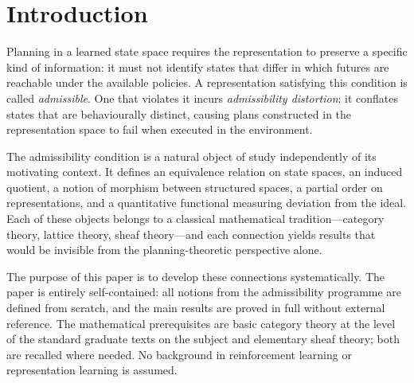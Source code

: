\documentclass[11pt, a4paper]{article}
\theoremstyle{plain}
\theoremstyle{definition}
\theoremstyle{remark}
\begin{document}
\newpage

\tableofcontents

\newpage

\section{Introduction}
\label{sec:intro}

Planning in a learned state space requires the representation to preserve a
specific kind of information: it must not identify states that differ in which
futures are reachable under the available policies. A representation satisfying
this condition is called \emph{admissible}. One that violates it incurs
\emph{admissibility distortion}: it conflates states that are behaviourally
distinct, causing plans constructed in the representation space to fail when
executed in the environment.

The admissibility condition is a natural object of study independently of its
motivating context. It defines an equivalence relation on state spaces, an
induced quotient, a notion of morphism between structured spaces, a partial
order on representations, and a quantitative functional measuring deviation
from the ideal. Each of these objects belongs to a classical mathematical
tradition---category theory, lattice theory, sheaf theory---and each
connection yields results that would be invisible from the planning-theoretic
perspective alone.

The purpose of this paper is to develop these connections systematically. The
paper is entirely self-contained: all notions from the admissibility programme
are defined from scratch, and the main results are proved in full without
external reference. The mathematical prerequisites are basic category theory
at the level of the standard graduate texts on the subject and elementary
sheaf theory; both are recalled where needed. No background in reinforcement
learning or representation learning is assumed.
\end{document}
